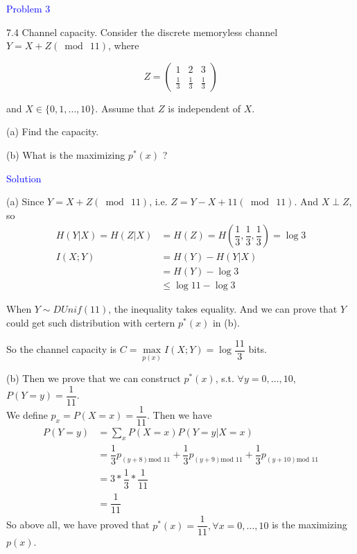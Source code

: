 \textcolor{blue}{Problem 3}

7.4 Channel capacity. Consider the discrete memoryless channel $Y=X+Z(\bmod\ 11)$, where

$$
Z=\left(\begin{array}{lll}
1 & 2 & 3 \\
\frac{1}{3} & \frac{1}{3} & \frac{1}{3}
\end{array}\right)
$$

and $X \in\{0,1, \ldots, 10\}$. Assume that $Z$ is independent of $X$.

(a) Find the capacity.

(b) What is the maximizing $p^*(x)$ ?

\textcolor{blue}{Solution}

(a) Since $Y=X+Z(\bmod\ 11)$, i.e. $Z=Y-X+11(\bmod\ 11)$. And $X\perp Z$, so
\begin{align*}
H(Y|X)=H(Z|X) &= H(Z)=H\left(\dfrac{1}{3},\dfrac{1}{3},\dfrac{1}{3}\right)=\log 3 \\
I(X;Y) &= H(Y)-H(Y|X) \\
&= H(Y) - \log 3 \\
&\leq \log 11 - \log 3
\end{align*}

When $Y\sim DUnif\left(11\right)$, the inequality takes equality. And we can prove that $Y$ could get such distribution with certern $p^*(x)$ in (b).

So the channel capacity is $C=\max\limits_{p(x)}I(X;Y)=\log \dfrac{11}{3}$ bits.

(b) Then we prove that we can construct $p^*(x)$, s.t. $\forall y=0,\ldots,10$, $P(Y=y)=\dfrac{1}{11}$. \\
We define $p_x=P(X=x)=\dfrac{1}{11}$. Then we have
\begin{align*}
P(Y=y) &= \sum_{x}P(X=x)P(Y=y|X=x) \\
&= \dfrac{1}{3}p_{(y+8)\text{mod\ } 11} + \dfrac{1}{3}p_{(y+9)\text{mod\ } 11} + \dfrac{1}{3}p_{(y+10)\text{mod\ } 11} \\
&= 3 * \dfrac{1}{3} * \dfrac{1}{11} \\
&= \dfrac{1}{11}
\end{align*}
So above all, we have proved that $p^*(x)=\dfrac{1}{11}, \forall x=0, \ldots, 10$ is the maximizing $p(x)$.

\newpage
